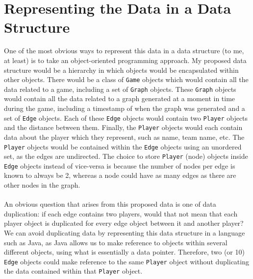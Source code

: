 \documentclass[a4paper,11pt]{article}
\begin{document}
\section{Representing the Data in a Data Structure} \label{sec:data_structure}
One of the most obvious ways to represent this data in a data structure (to me, at least) is to take an object-oriented programming approach.
My proposed data structure would be a hierarchy in which objects would be encapsulated within other objects.
There would be a class of \texttt{Game} objects which would contain all the data related to a game, including a set of \texttt{Graph} objects. 
These \texttt{Graph} objects would contain all the data related to a graph generated at a moment in time during the game, including a timestamp of when the graph was generated and a set of 
\texttt{Edge} objects.
Each of these \texttt{Edge} objects would contain two \texttt{Player} objects and the distance between them. 
Finally, the \texttt{Player} objects would each contain data about the player which they represent, such as name, team name, etc.
The \texttt{Player} objects would be contained within the \texttt{Edge} objects using an unordered set, as the edges are undirected.
The choice to store \texttt{Player} (node) objects inside \texttt{Edge} objects instead of vice-versa is because the number of nodes per edge 
is known to always be 2, whereas a node could have as many edges as there are other nodes in the graph.
\\\\
An obvious question that arises from this proposed data is one of data duplication: if each edge contains two players, would that not mean that each player object is duplicated for every edge object 
between it and another player? 
We can avoid duplicating data by representing this data structure in a language such as Java, as Java allows us to make reference to objects within several different objects, using what is essentially a 
data pointer.
Therefore, two (or 10) \texttt{Edge} objects could make reference to the same \texttt{Player} object without duplicating the data contained within that \texttt{Player} object.
\end{document}
